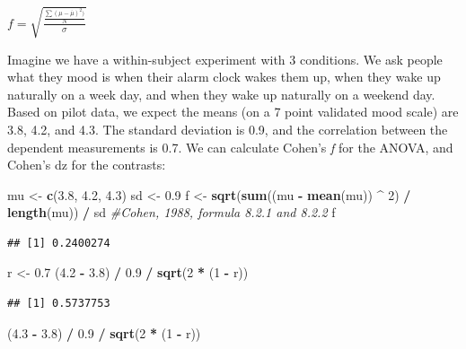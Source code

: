 \documentclass[
]{book}
\newenvironment{Shaded}{\begin{snugshade}}{\end{snugshade}}
\newcommand{\CommentTok}[1]{\textcolor[rgb]{0.56,0.35,0.01}{\textit{#1}}}
\newcommand{\DecValTok}[1]{\textcolor[rgb]{0.00,0.00,0.81}{#1}}
\newcommand{\FloatTok}[1]{\textcolor[rgb]{0.00,0.00,0.81}{#1}}
\newcommand{\KeywordTok}[1]{\textcolor[rgb]{0.13,0.29,0.53}{\textbf{#1}}}
\newcommand{\NormalTok}[1]{#1}
\newcommand{\OperatorTok}[1]{\textcolor[rgb]{0.81,0.36,0.00}{\textbf{#1}}}
\newcommand{\StringTok}[1]{\textcolor[rgb]{0.31,0.60,0.02}{#1}}
\begin{document}
\(f = \sqrt{\frac{\frac{\sum(\mu-\overline{\mu})^2)}N}\sigma}\)

Imagine we have a within-subject experiment with 3 conditions. We ask people what they mood is when their alarm clock wakes them up, when they wake up naturally on a week day, and when they wake up naturally on a weekend day. Based on pilot data, we expect the means (on a 7 point validated mood scale) are 3.8, 4.2, and 4.3. The standard deviation is 0.9, and the correlation between the dependent measurements is 0.7. We can calculate Cohen's \emph{f} for the ANOVA, and Cohen's dz for the contrasts:

\begin{Shaded}
\begin{Highlighting}[]
\NormalTok{mu <-}\StringTok{ }\KeywordTok{c}\NormalTok{(}\FloatTok{3.8}\NormalTok{, }\FloatTok{4.2}\NormalTok{, }\FloatTok{4.3}\NormalTok{)}
\NormalTok{sd <-}\StringTok{ }\FloatTok{0.9}
\NormalTok{f <-}\StringTok{ }\KeywordTok{sqrt}\NormalTok{(}\KeywordTok{sum}\NormalTok{((mu }\OperatorTok{-}\StringTok{ }\KeywordTok{mean}\NormalTok{(mu)) }\OperatorTok{^}\StringTok{ }\DecValTok{2}\NormalTok{) }\OperatorTok{/}\StringTok{ }\KeywordTok{length}\NormalTok{(mu)) }\OperatorTok{/}\StringTok{ }\NormalTok{sd }
\CommentTok{#Cohen, 1988, formula 8.2.1 and 8.2.2}
\NormalTok{  f}
\end{Highlighting}
\end{Shaded}

\begin{verbatim}
## [1] 0.2400274
\end{verbatim}

\begin{Shaded}
\begin{Highlighting}[]
\NormalTok{  r <-}\StringTok{ }\FloatTok{0.7}
\NormalTok{  (}\FloatTok{4.2} \OperatorTok{-}\StringTok{ }\FloatTok{3.8}\NormalTok{) }\OperatorTok{/}\StringTok{ }\FloatTok{0.9} \OperatorTok{/}\StringTok{ }\KeywordTok{sqrt}\NormalTok{(}\DecValTok{2} \OperatorTok{*}\StringTok{ }\NormalTok{(}\DecValTok{1} \OperatorTok{-}\StringTok{ }\NormalTok{r))}
\end{Highlighting}
\end{Shaded}

\begin{verbatim}
## [1] 0.5737753
\end{verbatim}

\begin{Shaded}
\begin{Highlighting}[]
\NormalTok{  (}\FloatTok{4.3} \OperatorTok{-}\StringTok{ }\FloatTok{3.8}\NormalTok{) }\OperatorTok{/}\StringTok{ }\FloatTok{0.9} \OperatorTok{/}\StringTok{ }\KeywordTok{sqrt}\NormalTok{(}\DecValTok{2} \OperatorTok{*}\StringTok{ }\NormalTok{(}\DecValTok{1} \OperatorTok{-}\StringTok{ }\NormalTok{r))}
\end{Highlighting}
\end{Shaded}
\end{document}
